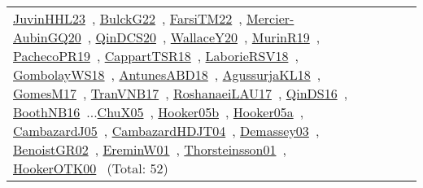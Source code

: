 {\begin{longtable}{p{3cm}r>{\raggedright\arraybackslash}p{6cm}>{\raggedright\arraybackslash}p{6cm}>{\raggedright\arraybackslash}p{8cm}}
\href{../works/JuvinHHL23.pdf}{JuvinHHL23}~\cite{JuvinHHL23}, \href{../works/BulckG22.pdf}{BulckG22}~\cite{BulckG22}, \href{../works/FarsiTM22.pdf}{FarsiTM22}~\cite{FarsiTM22}, \href{../works/Mercier-AubinGQ20.pdf}{Mercier-AubinGQ20}~\cite{Mercier-AubinGQ20}, \href{../works/QinDCS20.pdf}{QinDCS20}~\cite{QinDCS20}, \href{../works/WallaceY20.pdf}{WallaceY20}~\cite{WallaceY20}, \href{../works/MurinR19.pdf}{MurinR19}~\cite{MurinR19}, \href{../works/PachecoPR19.pdf}{PachecoPR19}~\cite{PachecoPR19}, \href{../works/CappartTSR18.pdf}{CappartTSR18}~\cite{CappartTSR18}, \href{../works/LaborieRSV18.pdf}{LaborieRSV18}~\cite{LaborieRSV18}, \href{../works/GombolayWS18.pdf}{GombolayWS18}~\cite{GombolayWS18}, \href{../works/AntunesABD18.pdf}{AntunesABD18}~\cite{AntunesABD18}, \href{../works/AgussurjaKL18.pdf}{AgussurjaKL18}~\cite{AgussurjaKL18}, \href{../works/GomesM17.pdf}{GomesM17}~\cite{GomesM17}, \href{../works/TranVNB17.pdf}{TranVNB17}~\cite{TranVNB17}, \href{../works/RoshanaeiLAU17.pdf}{RoshanaeiLAU17}~\cite{RoshanaeiLAU17}, \href{../works/QinDS16.pdf}{QinDS16}~\cite{QinDS16}, \href{../works/BoothNB16.pdf}{BoothNB16}~\cite{BoothNB16}...\href{../works/ChuX05.pdf}{ChuX05}~\cite{ChuX05}, \href{../works/Hooker05b.pdf}{Hooker05b}~\cite{Hooker05b}, \href{../works/Hooker05a.pdf}{Hooker05a}~\cite{Hooker05a}, \href{../works/CambazardJ05.pdf}{CambazardJ05}~\cite{CambazardJ05}, \href{../works/CambazardHDJT04.pdf}{CambazardHDJT04}~\cite{CambazardHDJT04}, \href{../works/Demassey03.pdf}{Demassey03}~\cite{Demassey03}, \href{../works/BenoistGR02.pdf}{BenoistGR02}~\cite{BenoistGR02}, \href{../works/EreminW01.pdf}{EreminW01}~\cite{EreminW01}, \href{../works/Thorsteinsson01.pdf}{Thorsteinsson01}~\cite{Thorsteinsson01}, \href{../works/HookerOTK00.pdf}{HookerOTK00}~\cite{HookerOTK00} (Total: 52)\\

\end{longtable}}
